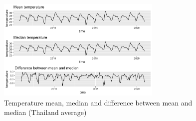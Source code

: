 \documentclass[parskip]{scrartcl}
\begin{document}
\begin{figure}[htbp] 
	\centering
	\includegraphics[width=0.7\textwidth]{fig/mean_median_temp.png}
	\caption{Temperature mean, median and difference between mean and median (Thailand average)}
	\label{fig:mean_median_temp}
\end{figure}
\end{document}
